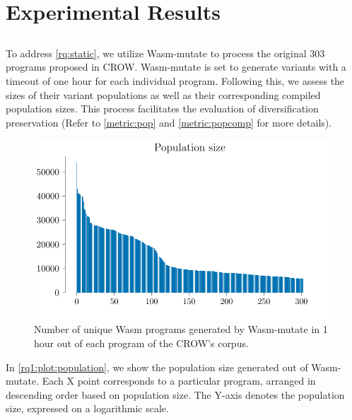 \documentclass[sigplan,screen]{acmart}
\newcommand{\tool}{Wasm-mutate\xspace}
\newcommand{\wasm}{Wasm\xspace}
\begin{document}
\section{Experimental Results}
\label{results}

\subsection{\rqstatic}
\label{rq:static:results}

\newcommand{\preserved}{72\%\xspace}

To address \ref{rq:static}, we utilize \tool to process the original 303 programs proposed in CROW\cite{arteaga2020crow}. 
\tool is set to generate variants with a timeout of one hour for each individual program. 
Following this, we assess the sizes of their variant populations as well as their corresponding compiled population sizes. 
This process facilitates the evaluation of diversification preservation (Refer to \autoref{metric:pop} and \autoref{metric:popcomp} for more details).

\begin{figure}
    \centering
    \includegraphics[width=\linewidth]{plots/rq1/population.pdf}
    \caption{Number of unique \wasm programs generated by \tool in 1 hour out of each program of the CROW's corpus.}
  \label{rq1:plot:population}
\end{figure}


In \autoref{rq1:plot:population}, we show the population size generated out of \tool. 
Each X point corresponds to a particular program, arranged in descending order based on population size. 
The Y-axis denotes the population size, expressed on a logarithmic scale. 
\end{document}
